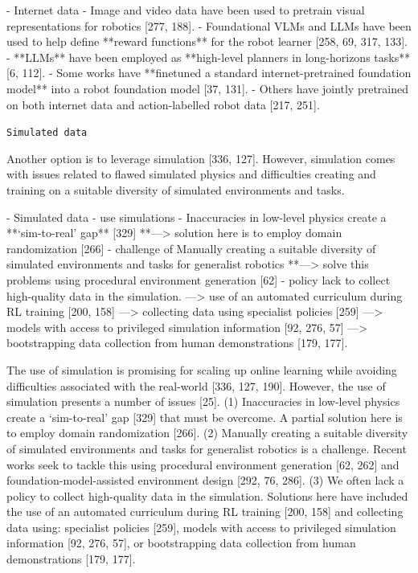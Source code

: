 	- Internet data
	    - Image and video data have been used to pretrain visual representations for robotics [277, 188].
    - Foundational VLMs and LLMs have been used to help define **reward functions** for the robot learner [258, 69, 317, 133].
    - **LLMs** have been employed as **high-level planners in long-horizons tasks** [6, 112].
    - Some works have **finetuned a standard internet-pretrained foundation model** into a robot foundation model [37, 131].
    - Others have jointly pretrained on both internet data and action-labelled robot data [217, 251].























	\item \texttt{Simulated data}
	
	Another option is to leverage simulation
	[336, 127]. However, simulation comes with issues related to flawed simulated physics and difficulties creating
	and training on a suitable diversity of simulated environments and tasks.

	- Simulated data
    - use simulations
    - Inaccuracies in low-level physics create a **‘sim-to-real’ gap** [329]
    **—> solution here is to employ domain randomization [266]
    - challenge of Manually creating a suitable diversity of simulated environments and tasks for generalist robotics 
    **—> solve this problems using procedural environment generation [62]
    - policy lack to collect high-quality data in the simulation.
    —> use of an automated curriculum during RL training [200, 158] 
    —> collecting data using specialist policies [259]
    —> models with access to privileged simulation information [92, 276, 57]
    —> bootstrapping data collection from human demonstrations [179, 177].


The use of simulation is promising for scaling up online learning while avoiding difficulties associated with the real-world [336, 127, 190]. However, the use of simulation presents a number
of issues [25]. (1) Inaccuracies in low-level physics create a ‘sim-to-real’ gap [329] that must be overcome.
A partial solution here is to employ domain randomization [266]. (2) Manually creating a suitable diversity
of simulated environments and tasks for generalist robotics is a challenge. Recent works seek to tackle this
using procedural environment generation [62, 262] and foundation-model-assisted environment design
[292, 76, 286]. (3) We often lack a policy to collect high-quality data in the simulation. Solutions here
have included the use of an automated curriculum during RL training [200, 158] and collecting data
using: specialist policies [259], models with access to privileged simulation information [92, 276, 57], or
bootstrapping data collection from human demonstrations [179, 177].

